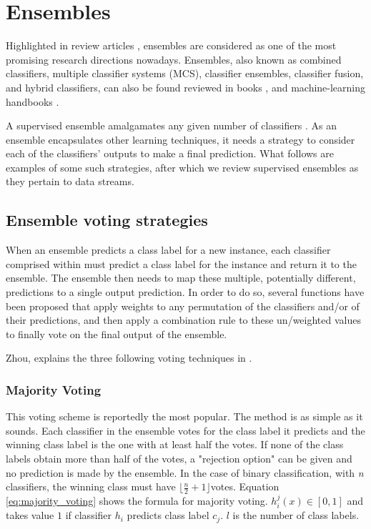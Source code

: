 \section{Ensembles\label{section:ensembles}}
Highlighted in review articles \cite{jain2000statistical, KRAWCZYK2017132, oza2008classifier, polikar2006ensemble, rokach2009taxonomy, wozniak2014survey}, ensembles are considered as one of the most promising research directions nowadays. Ensembles, also known as combined classifiers, multiple classifier systems (MCS), classifier ensembles, classifier fusion, and hybrid classifiers, can also be found reviewed in books \cite{baruque2011fusion, kuncheva2004combining,rokach2010pattern,seni2010ensemble}, and machine-learning handbooks \cite{alpaydin2009introduction, duda2012pattern}.

A supervised ensemble amalgamates any given number of classifiers \cite{KRAWCZYK2017132,opitz1999popular,polikar2006ensemble,rokach2010ensemble}. As an ensemble encapsulates other learning techniques, it needs a strategy to consider each of the classifiers' outputs to make a final prediction. What follows are examples of some such strategies, after which we review supervised ensembles as they pertain to data streams.

\subsection{Ensemble voting strategies\label{section:voting_ensemble}}
When an ensemble predicts a class label for a new instance, each classifier comprised within must predict a class label for the instance and return it to the ensemble. The ensemble then needs to map these multiple, potentially different, predictions to a single output prediction. In order to do so, several functions have been proposed that apply weights to any permutation of the classifiers and/or of their predictions, and then apply a combination rule to these un/weighted values to finally vote on the final output of the ensemble.

Zhou, explains the three following voting techniques in \citep[72-75]{zhou2012ensemble}.

\subsubsection{Majority Voting}
This voting scheme is reportedly the most popular. The method is as simple as it sounds. Each classifier in the ensemble votes for the class label it predicts and the winning class label is the one with at least half the votes. If none of the class labels obtain more than half of the votes, a "rejection option" can be given and no prediction is made by the ensemble. In the case of binary classification, with \textit{n} classifiers, the winning class must have $\lfloor \frac{n}{2} + 1\rfloor$votes. Equation \ref{eq:majority_voting} shows the formula for majority voting. $h_i^j(x) \in [0,1]$ and takes value $1$ if classifier $h_i$ predicts class label $c_j$. $l$ is the number of class labels.

